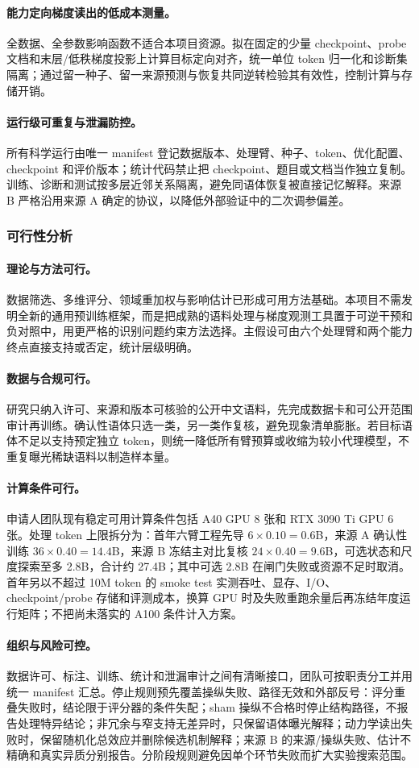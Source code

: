 \paragraph{能力定向梯度读出的低成本测量。}全数据、全参数影响函数不适合本项目资源。拟在固定的少量 checkpoint、probe 文档和末层/低秩梯度投影上计算目标定向对齐，统一单位 token 归一化和诊断集隔离；通过留一种子、留一来源预测与恢复共同逆转检验其有效性，控制计算与存储开销。

\paragraph{运行级可重复与泄漏防控。}所有科学运行由唯一 manifest 登记数据版本、处理臂、种子、token、优化配置、checkpoint 和评价版本；统计代码禁止把 checkpoint、题目或文档当作独立复制。训练、诊断和测试按多层近邻关系隔离，避免同语体恢复被直接记忆解释。来源 B 严格沿用来源 A 确定的协议，以降低外部验证中的二次调参偏差。

\subsubsection{可行性分析}

\paragraph{理论与方法可行。}数据筛选、多维评分、领域重加权与影响估计已形成可用方法基础\cite{harnessingdiversityfor2024,doremioptimizingdata2023,dogedomainreweighting2023,trainingdatainfluence2024,scalableinfluenceand2024}。本项目不需发明全新的通用预训练框架，而是把成熟的语料处理与梯度观测工具置于可逆干预和负对照中，用更严格的识别问题约束方法选择。主假设可由六个处理臂和两个能力终点直接支持或否定，统计层级明确。

\paragraph{数据与合规可行。}研究只纳入许可、来源和版本可核验的公开中文语料，先完成数据卡和可公开范围审计再训练。确认性语体只选一类，另一类作复核，避免现象清单膨胀。若目标语体不足以支持预定独立 token，则统一降低所有臂预算或收缩为较小代理模型，不重复曝光稀缺语料以制造样本量。

\paragraph{计算条件可行。}申请人团队现有稳定可用计算条件包括 A40 GPU 8 张和 RTX 3090 Ti GPU 6 张。处理 token 上限拆分为：首年六臂工程先导 $6\times0.10=0.6$B，来源 A 确认性训练 $36\times0.40=14.4$B，来源 B 冻结主对比复核 $24\times0.40=9.6$B，可选状态和尺度探索至多 2.8B，合计约 27.4B；其中可选 2.8B 在闸门失败或资源不足时取消。首年另以不超过 10M token 的 smoke test 实测吞吐、显存、I/O、checkpoint/probe 存储和评测成本，换算 GPU 时及失败重跑余量后再冻结年度运行矩阵；不把尚未落实的 A100 条件计入方案。

\paragraph{组织与风险可控。}数据许可、标注、训练、统计和泄漏审计之间有清晰接口，团队可按职责分工并用统一 manifest 汇总。停止规则预先覆盖操纵失败、路径无效和外部反号：评分重叠失败时，结论限于评分器的条件失配；sham 操纵不合格时停止结构路径，不报告处理特异结论；非冗余与窄支持无差异时，只保留语体曝光解释；动力学读出失败时，保留随机化总效应并删除候选机制解释；来源 B 的来源/操纵失败、估计不精确和真实异质分别报告。分阶段规则避免因单个环节失败而扩大实验搜索范围。
